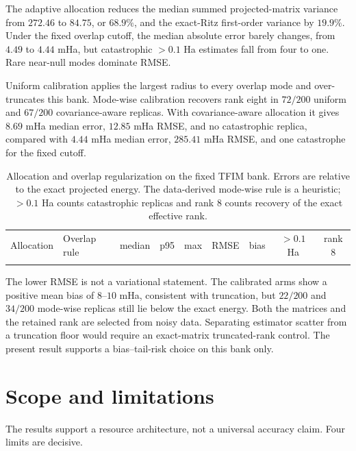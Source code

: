 \documentclass[aps,pra,reprint,superscriptaddress,nofootinbib,floatfix]{revtex4-2}
\begin{document}
The adaptive allocation reduces the median summed projected-matrix variance
from \(272.46\) to \(84.75\), or \(68.9\%\), and the exact-Ritz first-order
variance by \(19.9\%\).  Under the fixed overlap cutoff, the median absolute
error barely changes, from \(4.49\) to \(4.44\) mHa, but catastrophic
\(>0.1\) Ha estimates fall from four to one.  Rare near-null modes dominate
RMSE.

Uniform calibration applies the largest radius to every overlap mode and
over-truncates this bank.  Mode-wise calibration recovers rank eight in
\(72/200\) uniform and \(67/200\) covariance-aware replicas.  With
covariance-aware allocation it gives \(8.69\) mHa median error, \(12.85\) mHa
RMSE, and no catastrophic replica, compared with \(4.44\) mHa median error,
\(285.41\) mHa RMSE, and one catastrophe for the fixed cutoff.

\begin{table}[t]
\caption{Allocation and overlap regularization on the fixed TFIM bank.
Errors are relative to the exact projected energy.  The data-derived
mode-wise rule is a heuristic; \(>0.1\) Ha counts catastrophic replicas and
rank \(8\) counts recovery of the exact effective rank.}
\label{tab:finite-shot}
\scriptsize
\begin{ruledtabular}
\begin{tabular}{llccccccc}
Allocation & Overlap rule & median & p95 & max & RMSE & bias & \(>0.1\) Ha & rank \(8\) \\
\colrule

\end{tabular}
\end{ruledtabular}
\end{table}

The lower RMSE is not a variational statement.  The calibrated arms show a
positive mean bias of \(8\)--\(10\) mHa, consistent with truncation, but
\(22/200\) and \(34/200\) mode-wise replicas still lie below the exact energy.
Both the matrices and the retained rank are selected from noisy data.
Separating estimator scatter from a truncation floor would require an
exact-matrix truncated-rank control.  The present result supports a
bias--tail-risk choice on this bank only.

\section{Scope and limitations}
\label{sec:limits}

The results support a resource architecture, not a universal accuracy claim.
Four limits are decisive.
\end{document}
